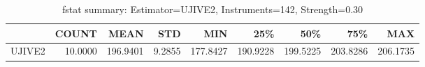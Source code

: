 \begin{table}[ht]
\centering
\caption{fstat summary: Estimator=UJIVE2, Instruments=142, Strength=0.30}
\begin{tabular}{lrrrrrrrr}
\toprule
 & COUNT & MEAN & STD & MIN & 25\% & 50\% & 75\% & MAX \\
\midrule
UJIVE2 & 10.0000 & 196.9401 & 9.2855 & 177.8427 & 190.9228 & 199.5225 & 203.8286 & 206.1735 \\
\bottomrule
\end{tabular}
\end{table}
